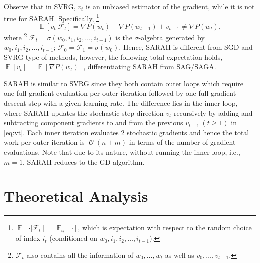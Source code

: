 \documentclass{article}
\DeclareMathOperator{\Exp}{\mathbb{E}}           %
\DeclareMathOperator{\Ocal}{\mathcal{O}}
\begin{document}
Observe that in SVRG, $v_t$ is an unbiased estimator of the gradient, while it is not true for SARAH. Specifically,  \footnote{
$\Exp [\cdot | \mathcal{F}_{t}] = \Exp_{i_{t}}[\cdot]$, which is  expectation with respect to the random choice of index $i_{t}$ (conditioned on
$w_0, i_1, i_2, \dots, i_{t-1}$).}
\begin{equation}\label{eq:NotSGD}
\Exp[v_{t} | \mathcal{F}_{t}]  = \nabla P(w_{t}) - \nabla P(w_{t-1}) + v_{t-1}\neq \nabla P(w_{t}),
\end{equation} 
where \footnote{$\mathcal{F}_{t}$ also contains all the information of $w_0,\dots,w_{t}$ as well as $v_0,\dots,v_{t-1}.$} $\mathcal{F}_{t} = \sigma(w_0,i_1,i_2,\dots,i_{t-1})$ is the $\sigma$-algebra generated by $w_0,i_1,i_2,\dots,i_{t-1}$; $\mathcal{F}_{0} = \mathcal{F}_{1} = \sigma(w_0)$.  
Hence, SARAH is different from SGD and SVRG type of methods, however, the following total expectation holds, $\Exp[v_{t}] = \Exp[\nabla P(w_{t})]$, differentiating SARAH from SAG/SAGA.

SARAH is similar to SVRG since they both contain outer loops which require one full gradient evaluation per outer iteration followed by one full gradient descent step  with a given learning rate. The difference lies in the inner loop, where SARAH updates the stochastic step direction $v_t$ recursively by adding and subtracting component gradients to and from the previous $v_{t-1}\ (t\geq 1)$ in \eqref{eq:vt}. Each inner iteration evaluates 
$2$ stochastic gradients and hence the total work per outer iteration is $\Ocal(n+m)$ in terms of the number of gradient evaluations. 
Note that due to its nature, without running the inner loop, i.e., $m = 1$, SARAH reduces to the  GD algorithm. 



\section{Theoretical Analysis}
\end{document}
